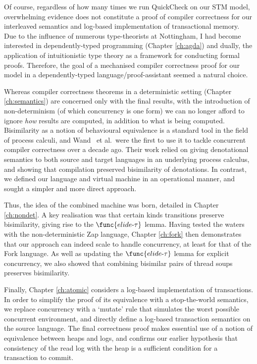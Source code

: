 Of course, regardless of how many times we run QuickCheck on our STM model,
overwhelming evidence does not constitute a proof of compiler correctness
for our interleaved semantics and log-based implementation of transactional
memory. Due to the influence of numerous type-theorists at Nottingham, I had
become interested in dependently-typed programming (Chapter \ref{ch:agda})
and dually, the application of intuitionistic type theory as a framework for
conducting formal proofs. Therefore, the goal of a mechanised compiler
correctness proof for our model in a dependently-typed
language/proof-assistant seemed a natural choice.

Whereas compiler correctness theorems in a deterministic setting (Chapter
\ref{ch:semantics}) are concerned only with the final results, with the
introduction of non-determinism (of which concurrency is one form) we can no
longer afford to ignore \emph{how} results are computed, in addition to what
is being computed. Bisimilarity as a notion of behavioural equivalence is
a standard tool in the field of process calculi, and
Wand~\cite{wand95-parallel,wand95-denotational,gladstein96-concurrent} et
al.~were the first to use it to tackle concurrent compiler correctness over
a decade ago. Their work relied on giving denotational semantics to both
source and target languages in an underlying process calculus, and showing
that compilation preserved bisimilarity of denotations. In contrast, we
defined our language and virtual machine in an operational manner, and
sought a simpler and more direct approach.

Thus, the idea of the combined machine was born, detailed in Chapter
\ref{ch:nondet}. A key realisation was that certain kinds transitions
preserve bisimilarity, giving rise to the $\func{elide\text-\tau}$ lemma.
Having tested the waters with the non-deterministic Zap language, Chapter
\ref{ch:fork} then demonstrates that our approach can indeed scale to handle
concurrency, at least for that of the Fork language. As well as updating the
$\func{elide\text-\tau}$ lemma for explicit concurrency, we also showed that
combining bisimilar pairs of thread soups preserves bisimilarity.

Finally, Chapter \ref{ch:atomic} considers a log-based implementation of
transactions. In order to simplify the proof of its equivalence with
a stop-the-world semantics, we replace concurrency with a `mutate' rule that
simulates the worst possible concurrent environment, and directly define
a log-based transaction semantics on the source language. The final
correctness proof makes essential use of a notion of equivalence between
heaps and logs, and confirms our earlier hypothesis that consistency of the
read log with the heap is a sufficient condition for a transaction to
commit.

